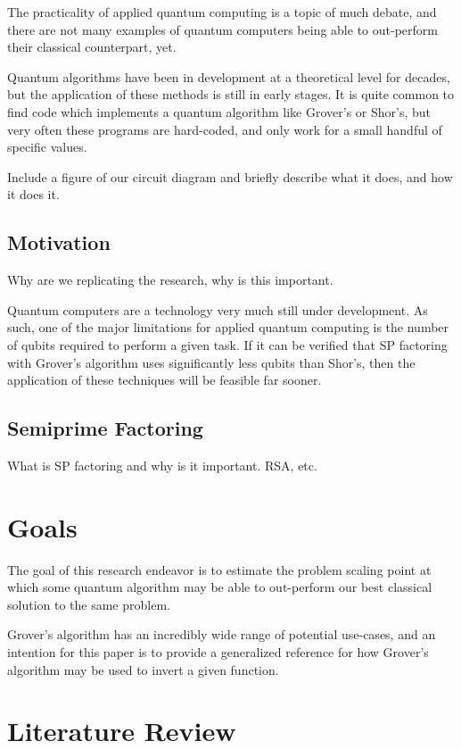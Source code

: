 \documentclass[twocolumn]{cinc}
\begin{document}
The practicality of applied quantum computing is a topic of much debate,
and there are not many examples of quantum computers being able to out-perform
their classical counterpart, yet.

Quantum algorithms have been in development at a theoretical level for
decades, but the application of these methods is still in early stages.
It is quite common to find code which implements a quantum algorithm like
Grover's or Shor's, but very often these programs are hard-coded, and only
work for a small handful of specific values\cite{shors_ibm}.

Include a figure of our circuit diagram and briefly describe what it 
does, and how it does it.

  \subsection{Motivation}

  Why are we replicating the research, why is this important.

  Quantum computers are a technology very much still under development. 
  As such, one of the major limitations for applied quantum computing is 
  the number of qubits required to perform a given task. If it can be verified 
  that SP factoring with Grover's algorithm uses significantly less qubits than
  Shor's, then the application of these techniques will be feasible far sooner.

  \subsection{Semiprime Factoring}  

  What is SP factoring and why is it important. RSA, etc.

\section{Goals}

The goal of this research endeavor is to estimate the problem scaling point
at which some quantum algorithm may be able to out-perform our best classical
solution to the same problem.

Grover's algorithm has an incredibly wide range of potential use-cases,
and an intention for this paper is to provide a generalized reference
for how Grover's algorithm may be used to invert a given function.

\section{Literature Review}
\end{document}
